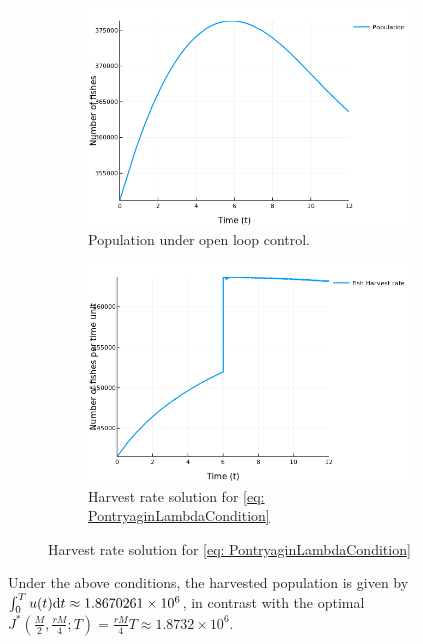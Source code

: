 \begin{figure}[H]
	\caption{Smooth Control for Open Loop Strategy.}
	\begin{subfigure}{0.48\textwidth}
		\includegraphics[width=0.95\textwidth]{Population.png}
		\caption{Population under open loop control.}
	\end{subfigure}
	\begin{subfigure}{0.48\textwidth}
		\includegraphics[width=0.95\textwidth]{Harvest}
		\caption{Harvest rate solution for \ref{eq: PontryaginLambdaCondition} }
	\end{subfigure}
\end{figure}
Under the above conditions, the harvested population is given by $\int_{0}^{T} u(t) \mathrm{d} t \approx 1.8670261\times 10^6$, in contrast with the optimal $J^*(\frac{M}{2}, \frac{rM}{4}; T)=\frac{rM}{4}T\approx1.8732\times 10^6$.
